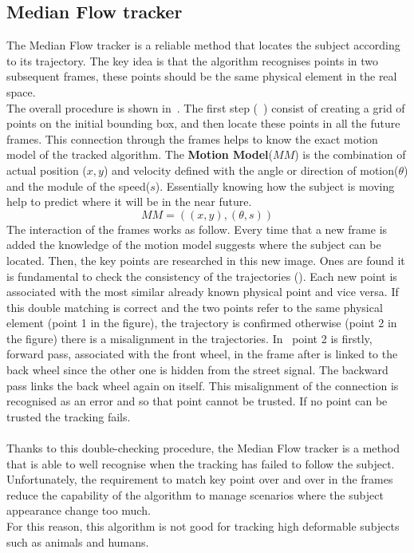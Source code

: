 \subsection{Median Flow tracker} \label{sec:medianflow}
The Median Flow tracker\cite{medianFlow} is a reliable method that locates the subject according to its trajectory. The key idea is that the algorithm recognises points in two subsequent frames, these points should be the same physical element in the real space.\\
The overall procedure is shown in~. The first step (~) consist of creating a grid of points on the initial bounding box, and then locate these points in all the future frames. This connection through the frames helps to know the exact motion model of the tracked algorithm. The \textbf{Motion Model}($MM$) is the combination of actual position ($x, y$) and velocity defined with the angle or direction of motion($\theta$) and the module of the speed($s$). Essentially knowing how the subject is moving help to predict where it will be in the near future.
$$MM = ((x, y), (\theta, s))$$
The interaction of the frames works as follow. Every time that a new frame is added the knowledge of the motion model suggests where the subject can be located. Then, the key points are researched in this new image. Ones are found it is fundamental to check the consistency of the trajectories (). Each new point is associated with the most similar already known physical point and vice versa. If this double matching is correct and the two points refer to the same physical element (point 1 in the figure), the trajectory is confirmed otherwise (point 2 in the figure) there is a misalignment in the trajectories. In~ point 2 is firstly, forward pass, associated with the front wheel, in the frame after is linked to the back wheel since the other one is hidden from the street signal. The backward pass links the back wheel again on itself. This misalignment of the connection is recognised as an error and so that point cannot be trusted. If no point can be trusted the tracking fails.\\
\\
Thanks to this double-checking procedure, the Median Flow tracker is a method that is able to well recognise when the tracking has failed to follow the subject. Unfortunately, the requirement to match key point over and over in the frames reduce the capability of the algorithm to manage scenarios where the subject appearance change too much.\\
For this reason, this algorithm is not good for tracking high deformable subjects such as animals and humans.

